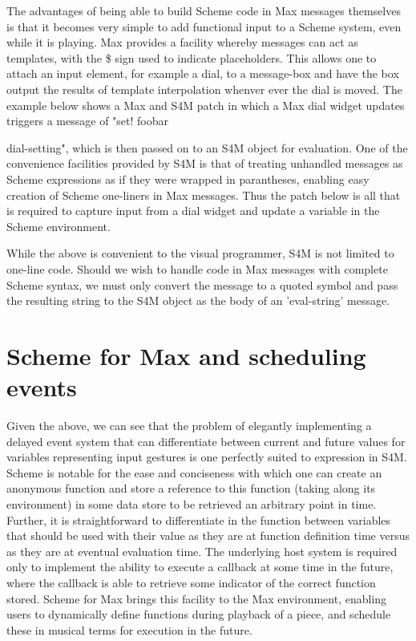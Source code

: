 \documentclass[acmsmall]{acmart}
\begin{document}
The advantages of being able to build Scheme code in Max messages themselves is
that it becomes very simple to add functional input to a Scheme system, even
while it is playing. Max provides a facility whereby messages can act as templates,
with the \$ sign used to indicate placeholders. This allows one to attach an input
element, for example a dial, to a message-box and have the box output the results
of template interpolation whenver ever the dial is moved. 
The example below shows a Max and S4M patch in which a Max dial widget updates
triggers a message of "set! foobar {dial-setting", which is then passed on to
an S4M object for evaluation. One of the convenience facilities 
provided by S4M is that of treating unhandled messages as Scheme expressions
as if they were wrapped in parantheses, enabling easy creation of Scheme one-liners
in Max messages. Thus the patch below is all that is required to capture input
from a dial widget and update a variable in the Scheme environment.


While the above is convenient to the visual programmer, S4M is not limited 
to one-line code. Should we wish to handle code in Max messages with complete
Scheme syntax, we must only convert the message to a quoted symbol and pass
the resulting string to the S4M object as the body of an 'eval-string' message.


\section{Scheme for Max and scheduling events}

Given the above, we can see that the problem of elegantly implementing 
a delayed event system that can differentiate between current and future values
for variables representing input gestures is one perfectly suited to expression
in S4M. Scheme is notable for the ease and conciseness with which one can create an anonymous function
and store a reference to this function (taking along its environment) in some data
store to be retrieved an arbitrary point in time. Further, it is straightforward
to differentiate in the function between variables that should
be used with their value as they are at function definition time versus
as they are at eventual evaluation time. The underlying host system is required only to 
implement the ability to execute a callback at some time in the future, where 
the callback is able to retrieve some indicator of the correct function stored.
Scheme for Max brings this facility to the Max environment, enabling users to dynamically define
functions during playback of a piece, and schedule these in musical terms
for execution in the future.  


}
\end{document}
